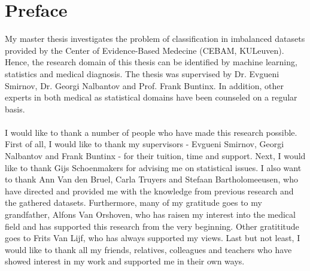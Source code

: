 \chapter*{Preface}
My master thesis investigates the problem of classification in imbalanced datasets provided by the Center of Evidence-Based Medecine (CEBAM, KULeuven). Hence, the research domain of this thesis can be identified by machine learning, statistics and medical diagnosis.
The thesis was supervised by Dr. Evgueni Smirnov, Dr. Georgi Nalbantov and Prof. Frank Buntinx. In addition, other experts in both medical as statistical domains have been counseled on a regular basis.
\\\\
I would like to thank a number of people who have made this research possible. First of all, I would like to thank  my supervisors - Evgueni Smirnov, Georgi Nalbantov and Frank Buntinx - for their tuition, time and support. Next, I would like to thank Gijs Schoenmakers for advising me on statistical issues. I also want to thank Ann Van den Bruel, Carla Truyers and Stefaan Bartholomeeusen, who have directed and provided me with the knowledge from previous research and the gathered datasets. Furthermore, many of my gratitude goes to my grandfather, Alfons Van Orshoven, who has raisen my interest into the medical field and has supported this research from the very beginning. Other gratititude goes to Frits Van Lijf, who has always supported my views. Last but not least, I would like to thank all my friends, relatives, colleagues and teachers who have showed interest in my work and supported me in their own ways.


